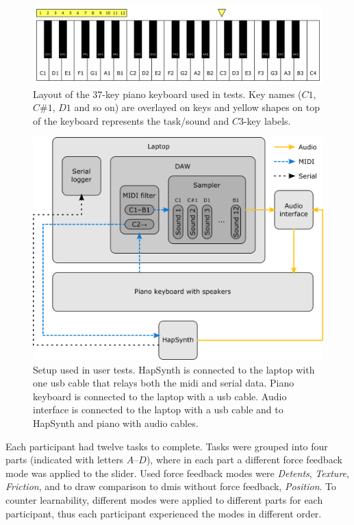 \begin{figure}[h]
	\centering
	\includegraphics[width=1.0\linewidth]{figures/keyboard.png}
	\caption{Layout of the 37-key piano keyboard used in tests. Key names ($C1$, $C\#1$, $D1$ and so on) are overlayed on keys and yellow shapes on top of the keyboard represents the task/sound and $C3$-key labels.}
	\label{keyboard}
\end{figure}

\begin{figure}[h]
	\centering
	\includegraphics[width=1.0\linewidth]{figures/setup.png}
	\caption{Setup used in user tests. HapSynth is connected to the laptop with one \gls{usb} cable that relays both the \gls{midi} and serial data. Piano keyboard is connected to the laptop with a \gls{usb} cable. Audio interface is connected to the laptop with a \gls{usb} cable and to HapSynth and piano with audio cables.}
	\label{setup}
\end{figure}

Each participant had twelve tasks to complete. Tasks were grouped into four parts (indicated with letters $A$--$D$), where in each part a different force feedback mode was applied to the slider. Used force feedback modes were \textit{Detents}, \textit{Texture}, \textit{Friction}, and to draw comparison to \glspl{dmi} without force feedback, \textit{Position}. To counter learnability, different modes were applied to different parts for each participant, thus each participant experienced the modes in different order.

